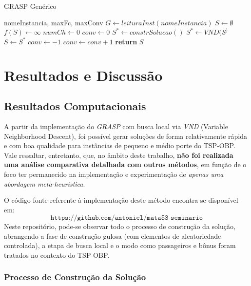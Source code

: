 \documentclass[12pt, a4paper]{report}
\begin{document}
\begin{algorithm}[H]
\caption{GRASP Genérico}
\begin{algorithmic}[1]
\Require nomeInstancia, maxFc, maxConv
\State $G \gets leituraInst(nomeInstancia)$
\State $S \gets \emptyset$ 
\State $f(S) \gets \infty$ 
\State $numCh \gets 0$ 
\State $conv \gets 0$ 
\State $S^* \gets constrSolucao()$ 
\State $S^* \gets VND(S^)$ 
\State $S \gets S^*$ 
\State $conv \gets -1$ 
\EndIf
\State $conv \gets conv + 1$ 
\EndWhile
\State \textbf{return} $S$ 
\end{algorithmic}
\end{algorithm}

\chapter{Resultados e Discussão}

\section{Resultados Computacionais}

A partir da implementação do \emph{GRASP} com busca local via \emph{VND} (Variable Neighborhood Descent), foi possível gerar soluções de forma relativamente rápida e com boa qualidade para instâncias de pequeno e médio porte do TSP-OBP. Vale ressaltar, entretanto, que, no âmbito deste trabalho, \textbf{não foi realizada uma análise comparativa detalhada com outros métodos}, em função de o foco ter permanecido na implementação e experimentação de \emph{apenas uma abordagem meta-heurística}.

O código-fonte referente à implementação deste método encontra-se disponível em: 
\[
\texttt{https://github.com/antoniel/mata53-seminario}
\]
Neste repositório, pode-se observar todo o processo de construção da solução, abrangendo a fase de construção gulosa (com elementos de aleatoriedade controlada), a etapa de busca local e o modo como passageiros e bônus foram tratados no contexto do TSP-OBP.

\subsection{Processo de Construção da Solução}
\end{document}

